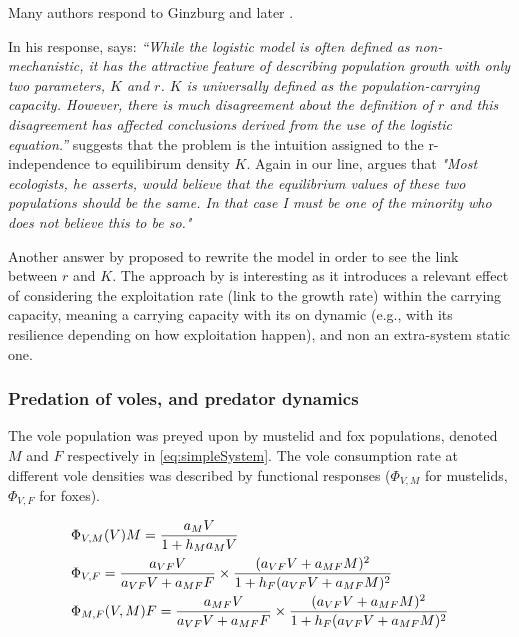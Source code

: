 \documentclass[11pt]{article}
\begin{document}
Many authors respond to Ginzburg \citep{Olson1992, Watkinson1992, Mackenzie1992, Berryman1992} and later \citep{Gabriel2005}.  

In his response, \citet{Olson1992} says: \textit{“While the logistic model is often defined as non-mechanistic, it has the attractive feature of describing population growth with only two parameters, $K$ and $r$. $K$ is universally defined as the population-carrying capacity. However, there is much disagreement about the definition of  $r$ and this disagreement has affected conclusions derived from the use of the logistic equation.”}
%
\citet{Olson1992} suggests that the problem is the intuition assigned to the r-independence to equilibirum density $K$.
%
Again in our line, \citet{Watkinson1992} argues that \textit{"Most ecologists, he asserts, would believe that the equilibrium values of these two populations should be the same. In that case I must be one of the minority who does not believe this to be so."} 

Another answer by \citet{Berryman1992} proposed to rewrite the model in order to see the link between $r$ and $K$. The approach by \citet{Berryman1992} is interesting as it introduces a relevant effect of considering  the exploitation rate (link to the growth rate) within the carrying capacity, meaning a carrying capacity with its on dynamic (e.g., with its resilience depending on how exploitation happen), and non an extra-system static one.

\subsubsection{Predation of voles, and predator dynamics}

The vole population was preyed upon by mustelid and fox populations, denoted $M$ and $F$ respectively in \eqref{eq:simpleSystem}. The vole consumption rate at different vole densities was described by functional responses ($\Phi_{V,M}$ for mustelids, $\Phi_{V,F}$  for foxes).

\begin{equation}
\begin{array}{l l}
\Phi_{V,M}(V)M = \dfrac{a_M V}{1 + h_M a_M V} \\[.3cm]
%
\Phi_{V,F} = \dfrac{a_{VF} V}{a_{VF}V + a_{MF}F} \times \dfrac{(a_{VF}V + a_{MF} M)^2}{1 + h_F(a_{VF}V + a_{MF} M)^2}\\[.3cm]
%
\Phi_{M,F}(V,M)F = \dfrac{a_{MF}V}{a_{VF}V + a_{MF}F} \times \dfrac{(a_{VF}V + a_{MF}M)^2}{1+h_F(a_{VF}V + a_{MF}M)^2}
\end{array}
\label{eq:functionResponse}
\end{equation}
\end{document}
